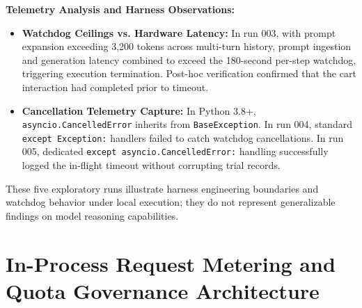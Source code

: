 \documentclass[11pt,a4paper]{article}
\begin{document}
\textbf{Telemetry Analysis and Harness Observations:}
\begin{itemize}
    \item \textbf{Watchdog Ceilings vs. Hardware Latency:} In run 003, with prompt expansion exceeding 3,200 tokens across multi-turn history, prompt ingestion and generation latency combined to exceed the 180-second per-step watchdog, triggering execution termination. Post-hoc verification confirmed that the cart interaction had completed prior to timeout.
    \item \textbf{Cancellation Telemetry Capture:} In Python 3.8+, \texttt{asyncio.CancelledError} inherits from \texttt{BaseException}. In run 004, standard \texttt{except Exception:} handlers failed to catch watchdog cancellations. In run 005, dedicated \texttt{except asyncio.CancelledError:} handling successfully logged the in-flight timeout without corrupting trial records.
\end{itemize}
These five exploratory runs illustrate harness engineering boundaries and watchdog behavior under local execution; they do not represent generalizable findings on model reasoning capabilities.

\clearpage
\section{In-Process Request Metering and Quota Governance Architecture}
\label{app:quota_governance}
\end{document}
